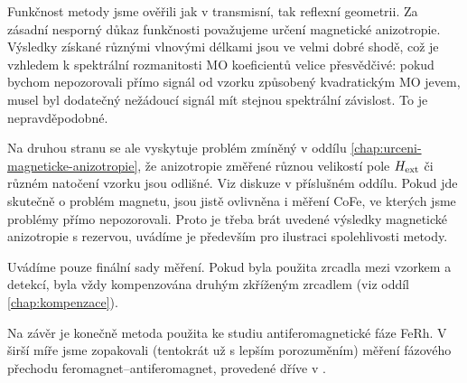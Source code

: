Funkčnost metody jsme ověřili jak v transmisní, tak reflexní geometrii.
Za zásadní nesporný důkaz funkčnosti považujeme určení magnetické anizotropie.
Výsledky získané různými vlnovými délkami jsou ve velmi dobré shodě, což je vzhledem k spektrální rozmanitosti MO koeficientů velice přesvědčivé: pokud bychom nepozorovali přímo signál od vzorku způsobený kvadratickým MO jevem, musel byl dodatečný nežádoucí signál mít stejnou spektrální závislost.
To je nepravděpodobné.

Na druhou stranu se ale vyskytuje problém zmíněný v oddílu \ref{chap:urceni-magneticke-anizotropie}, že anizotropie změřené různou velikostí pole $H_\textrm{ext}$ či různém natočení vzorku jsou odlišné.
Viz diskuze v příslušném oddílu.
Pokud jde skutečně o problém magnetu, jsou jistě ovlivněna i měření CoFe, ve kterých jsme problémy přímo nepozorovali.
Proto je třeba brát uvedené výsledky magnetické anizotropie s rezervou, uvádíme je především pro ilustraci spolehlivosti metody.

Uvádíme pouze finální sady měření.
Pokud byla použita zrcadla mezi vzorkem a detekcí, byla vždy kompenzována druhým zkříženým zrcadlem (viz oddíl \ref{chap:kompenzace}).

Na závěr je konečně metoda použita ke studiu antiferomagnetické fáze FeRh. 
V širší míře jsme zopakovali (tentokrát už s lepším porozuměním) měření fázového přechodu feromagnet--antiferomagnet, provedené dříve v \cite{kubascikMagnetooptickeStudiumAntiferomagnetickych2019}.
